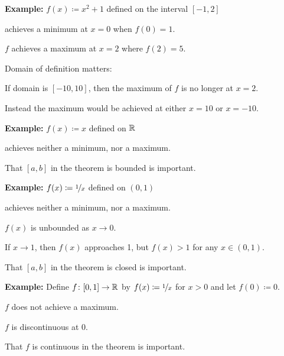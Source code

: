 \documentclass[10pt,aspectratio=169]{beamer}
\begin{document}
\begin{frame}

\textbf{Example:}
$f(x) \coloneqq x^2+1$ defined on the interval $[-1,2]$

achieves a minimum at $x=0$ when $f(0) = 1$.

\pause
$f$ achieves a maximum at $x=2$ where $f(2) = 5$.

\pause
\medskip

Domain of definition matters:

If domain is
$[-10,10]$, then the maximum of $f$ is no longer at $x=2$.

\pause
Instead the maximum would be achieved at either $x=10$ or $x=-10$.

\pause
\medskip

\textbf{Example:}
$f(x) \coloneqq x$ defined on ${\mathbb{R}}$

achieves neither a minimum, nor a maximum.

\pause
\medskip

That $[a,b]$ in the theorem is bounded is important.
\end{frame}

\begin{frame}

\textbf{Example:}
$f(x) \coloneqq \nicefrac{1}{x}$ defined on $(0,1)$

achieves neither a minimum, nor a maximum.

\pause
$f(x)$ is unbounded as $x \to 0$.

\pause
If $x \to 1$, then $f(x)$ approaches 1, but $f(x) > 1$ for any $x \in
(0,1)$.

\pause
\medskip

That $[a,b]$ in the theorem is closed is important.

\pause
\medskip

\textbf{Example:}
Define $f \colon [0,1] \to {\mathbb{R}}$ by 
$f(x) \coloneqq \nicefrac{1}{x}$ for $x > 0$ and let $f(0) \coloneqq 0$.

\pause
$f$ does not achieve a maximum.

\pause
$f$ is discontinuous at $0$.

\pause
\medskip

That $f$ is continuous in the theorem is important.
\end{frame}
\end{document}
